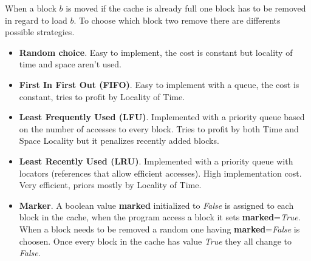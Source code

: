 \documentclass{report}
\begin{document}
\noindent
When a block \(b\) is moved if the cache is already full one block has to be removed in regard to load \(b\). To choose which block two remove there are differents possible strategies.
\begin{itemize}
    \item \textbf{Random choice}. Easy to implement, the cost is constant but locality of time and space aren't used.
    \item \textbf{First In First Out (FIFO)}. Easy to implement with a queue, the cost is constant, tries to profit by Locality of Time.
    \item \textbf{Least Frequently Used (LFU)}. Implemented with a priority queue based on the number of accesses to every block. Tries to profit by both Time and Space Locality but it penalizes recently added blocks.
    \item \textbf{Least Recently Used (LRU)}. Implemented with a priority queue with locators (references that allow efficient accesses). High implementation cost. Very efficient, priors mostly by Locality of Time.
    \item \textbf{Marker}. A boolean value \textbf{marked} initialized to \textit{False} is assigned to each block in the cache, when the program access a block it sets \textbf{marked}=\textit{True}. When a block needs to be removed a random one having \textbf{marked}=\textit{False} is choosen. Once every block in the cache has value \textit{True} they all change to \textit{False}. 
\end{itemize}
\end{document}
